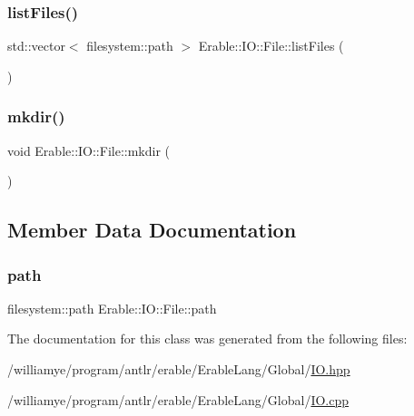 \mbox{\label{class_erable_1_1_i_o_1_1_file_a6a33109bcec2e9c38aff67d9e279218a}} 
\subsubsection{\texorpdfstring{listFiles()}{listFiles()}}
{\footnotesize\ttfamily std\+::vector$<$ filesystem\+::path $>$ Erable\+::\+I\+O\+::\+File\+::list\+Files (\begin{DoxyParamCaption}{ }\end{DoxyParamCaption})}

\mbox{\label{class_erable_1_1_i_o_1_1_file_ab3690b8b34c69e5fdeaa1919e0c2d65d}} 
\subsubsection{\texorpdfstring{mkdir()}{mkdir()}}
{\footnotesize\ttfamily void Erable\+::\+I\+O\+::\+File\+::mkdir (\begin{DoxyParamCaption}{ }\end{DoxyParamCaption})}



\subsection{Member Data Documentation}
\mbox{\label{class_erable_1_1_i_o_1_1_file_ac03fd0242a8e743fb874e84738fcb8cf}} 
\subsubsection{\texorpdfstring{path}{path}}
{\footnotesize\ttfamily filesystem\+::path Erable\+::\+I\+O\+::\+File\+::path\hspace{0.3cm}{\ttfamily [private]}}



The documentation for this class was generated from the following files\+:\begin{DoxyCompactItemize}
\item 
/williamye/program/antlr/erable/\+Erable\+Lang/\+Global/\mbox{\hyperlink{_i_o_8hpp}{I\+O.\+hpp}}\item 
/williamye/program/antlr/erable/\+Erable\+Lang/\+Global/\mbox{\hyperlink{_i_o_8cpp}{I\+O.\+cpp}}\end{DoxyCompactItemize}
